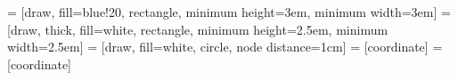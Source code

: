 \setlength{\cftbeforetoctitleskip}{-3em}  %
\setlength{\cftaftertoctitleskip}{0em}    %
\setlength{\cftbeforeloftitleskip}{-3em}  %
\setlength{\cftafterloftitleskip}{0em}    %
\setlength{\cftbeforelottitleskip}{-3em}  %
\setlength{\cftafterlottitleskip}{0em}    %

\setlength{\cftbeforechapskip}{0.675em}   %
\setlength{\cftbeforepartskip}{1.25em}    %

\patchcmd{\part}{\thispagestyle{plain}}{\thispagestyle{empty}}{}{}

\titleformat{\chapter}[hang]{\normalfont\huge\bfseries}{\thechapter}{1em}{\huge}   
\titlespacing*{\chapter}{0pt}{-50pt}{20pt}

\makeatletter
    \AtEveryBibitem{\global\undef\bbx@lasthash}
\makeatother


\pagestyle{fancy}
\fancyhf{}
\fancyhead[RO, LE]{\thepage}
\renewcommand{\headrulewidth}{0pt} \renewcommand{\footrulewidth}{0pt} 

\fancypagestyle{plain}{%
  \fancyhf{}
  \fancyhead[RO]{\thepage}
  \renewcommand{\headrulewidth}{0pt} \renewcommand{\footrulewidth}{0pt}%
}


 = [draw, fill=blue!20, rectangle, minimum height=3em, minimum width=3em]
 	  = [draw, thick, fill=white, rectangle, minimum height=2.5em, minimum width=2.5em]
 	  = [draw, fill=white, circle, node distance=1cm]
     = [coordinate]
    = [coordinate]




